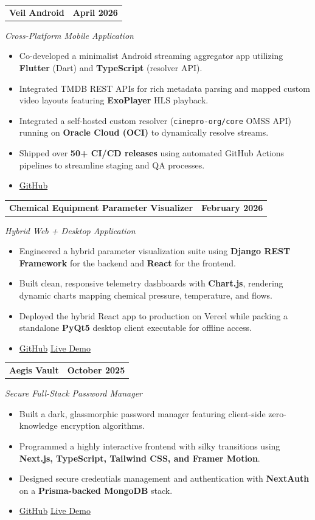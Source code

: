 \documentclass[10pt,a4paper]{article}
\makeatletter
\newcommand{\resumeProjectTitle}[2]{%
  \vspace{2pt}
  \noindent
  \begin{tabular*}{\textwidth}{@{}l@{\extracolsep{\fill}}r@{}}
    \textbf{#1} & \textbf{#2} \\
  \end{tabular*}%
  \vspace{-2pt}
}
\newcommand{\resumeProjectSubtitle}[1]{%
  \noindent\textit{#1}\vspace{1pt}%
}
\makeatother
\begin{document}
\resumeProjectTitle{Veil Android}{April 2026}
\resumeProjectSubtitle{Cross-Platform Mobile Application}
\begin{itemize}
  \item Co-developed a minimalist Android streaming aggregator app utilizing \textbf{Flutter} (Dart) and \textbf{TypeScript} (resolver API).
  \item Integrated TMDB REST APIs for rich metadata parsing and mapped custom video layouts featuring \textbf{ExoPlayer} HLS playback.
  \item Integrated a self-hosted custom resolver (\texttt{cinepro-org/core} OMSS API) running on \textbf{Oracle Cloud (OCI)} to dynamically resolve streams.
  \item Shipped over \textbf{50+ CI/CD releases} using automated GitHub Actions pipelines to streamline staging and QA processes.
  \item \href{https://github.com/dikshadamahe/veil-android}{GitHub}
\end{itemize}

\resumeProjectTitle{Chemical Equipment Parameter Visualizer}{February 2026}
\resumeProjectSubtitle{Hybrid Web + Desktop Application}
\begin{itemize}
  \item Engineered a hybrid parameter visualization suite using \textbf{Django REST Framework} for the backend and \textbf{React} for the frontend.
  \item Built clean, responsive telemetry dashboards with \textbf{Chart.js}, rendering dynamic charts mapping chemical pressure, temperature, and flows.
  \item Deployed the hybrid React app to production on Vercel while packing a standalone \textbf{PyQt5} desktop client executable for offline access.
  \item \href{https://github.com/dikshadamahe/fossee-project}{GitHub} \textbar{} \href{https://fossee-project-eta.vercel.app}{Live Demo}
\end{itemize}

\resumeProjectTitle{Aegis Vault}{October 2025}
\resumeProjectSubtitle{Secure Full-Stack Password Manager}
\begin{itemize}
  \item Built a dark, glassmorphic password manager featuring client-side zero-knowledge encryption algorithms.
  \item Programmed a highly interactive frontend with silky transitions using \textbf{Next.js, TypeScript, Tailwind CSS, and Framer Motion}.
  \item Designed secure credentials management and authentication with \textbf{NextAuth} on a \textbf{Prisma-backed MongoDB} stack.
  \item \href{https://github.com/dikshadamahe/Aegis-Vault}{GitHub} \textbar{} \href{https://aegis-vault.vercel.app}{Live Demo}
\end{itemize}
\end{document}
